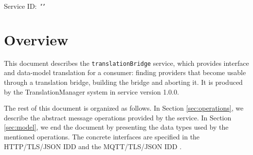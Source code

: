 \documentclass[a4paper]{arrowhead}
\begin{document}
\sloppy

\ArrowheadSetup

\begin{center}
  \vspace*{1cm}
  \huge{\arrowtitle}

  \vspace*{0.2cm}
  \LARGE{\arrowtype}
  \vspace*{1cm}

  \Large{Service ID: \textit{"\arrowid"}}

  \vspace*{\fill}


  \vspace*{1cm}
  \vspace*{\fill}

  \begin{abstract}
    This document describes the \texttt{translationBridge} service, version 1.0.0, produced by the TranslationManager support system of Arrowhead 5.2.2.
  \end{abstract}

  \vspace*{1cm}
\end{center}

\newpage

\tableofcontents
\newpage

\section{Overview}
\label{sec:overview}

This document describes the \texttt{translationBridge} service, which provides interface and data-model translation for a consumer: finding providers that become usable through a translation bridge, building the bridge and aborting it.
It is produced by the TranslationManager system \cite{tm-sysd} in service version 1.0.0.

The rest of this document is organized as follows.
In Section \ref{sec:operations}, we describe the abstract message operations provided by the service.
In Section \ref{sec:model}, we end the document by presenting the data types used by the mentioned operations.
The concrete interfaces are specified in the HTTP/TLS/JSON IDD \cite{tm-translationBridge-http-idd} and the MQTT/TLS/JSON IDD \cite{tm-translationBridge-mqtt-idd}.
\end{document}

